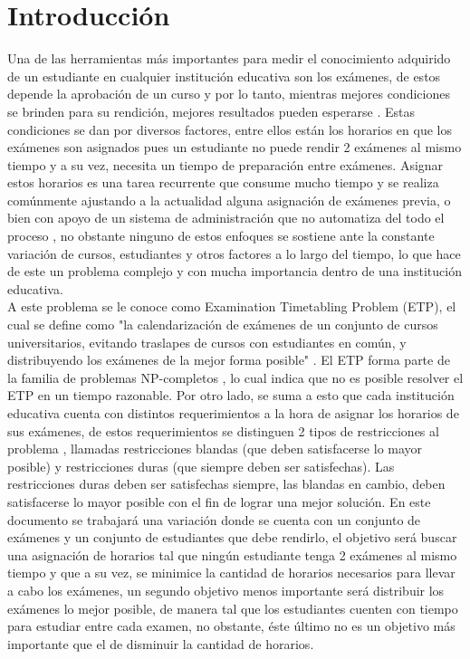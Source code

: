 \documentclass[letter, 10pt]{article}
\begin{document}
\section{Introducción}

Una de las herramientas más importantes para medir el conocimiento adquirido de un estudiante en cualquier institución educativa son los exámenes, de estos depende la aprobación de un curso y por lo tanto, mientras mejores condiciones se brinden para su rendición, mejores resultados pueden esperarse \cite{MUKLASON2019647}. Estas condiciones se dan por diversos factores, entre ellos están los horarios en que los exámenes son asignados pues un estudiante no puede rendir 2 exámenes al mismo tiempo y a su vez, necesita un tiempo de preparación entre exámenes. Asignar estos horarios es una tarea recurrente que consume mucho tiempo y se realiza comúnmente ajustando a la actualidad alguna asignación de exámenes previa, o bien con apoyo de un sistema de administración que no automatiza del todo el proceso \cite{NAJIAZIMI2005705}, no obstante ninguno de estos enfoques se sostiene ante la constante variación de cursos, estudiantes y otros factores a lo largo del tiempo, lo que hace de este un problema complejo y con mucha importancia dentro de una institución educativa.\\

A este problema se le conoce como Examination Timetabling Problem (ETP), el cual se define como "la calendarización de exámenes de un conjunto de cursos universitarios, evitando traslapes de cursos con estudiantes en común, y distribuyendo los exámenes de la mejor forma posible" \cite{Schaerf1999}. El ETP forma parte de la familia de problemas NP-completos \cite{10.1093/comjnl/10.1.85}, lo cual indica que no es posible resolver el ETP en un tiempo razonable. Por otro lado, se suma a esto que cada institución educativa cuenta con distintos requerimientos a la hora de asignar los horarios de sus exámenes, de estos requerimientos se distinguen 2 tipos de restricciones al problema \cite{Qu2009}, llamadas restricciones blandas (que deben satisfacerse lo mayor posible) y restricciones duras (que siempre deben ser satisfechas). Las restricciones duras deben ser satisfechas siempre, las blandas en cambio, deben satisfacerse lo mayor posible con el fin de lograr una mejor solución. En este documento se trabajará una variación donde se cuenta con un conjunto de exámenes y un conjunto de estudiantes que debe rendirlo, el objetivo será buscar una asignación de horarios tal que ningún estudiante tenga 2 exámenes al mismo tiempo y que a su vez, se minimice la cantidad de horarios necesarios para llevar a cabo los exámenes, un segundo objetivo menos importante será distribuir los exámenes lo mejor posible, de manera tal que los estudiantes cuenten con tiempo para estudiar entre cada examen, no obstante, éste último no es un objetivo más importante que el de disminuir la cantidad de horarios.\\
\end{document}
